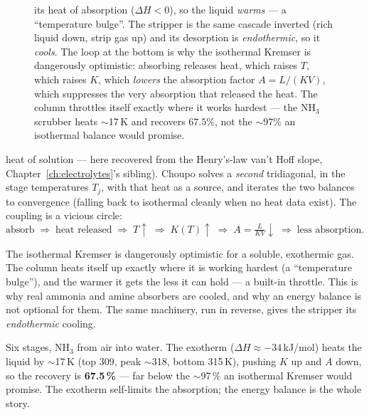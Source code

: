 \documentclass[11pt,a4paper]{article}
\begin{document}
\begin{figure}[ht]
{its heat of absorption ($\Delta H<0$), so the liquid \emph{warms} --- a
``temperature bulge''.  The stripper is the same cascade inverted (rich
liquid down, strip gas up) and its desorption is \emph{endothermic}, so
it \emph{cools}.  The loop at the bottom is why the isothermal Kremser is
dangerously optimistic: absorbing releases heat, which raises $T$, which
raises $K$, which \emph{lowers} the absorption factor $A=L/(KV)$, which
suppresses the very absorption that released the heat.  The column
throttles itself exactly where it works hardest --- the NH$_3$ scrubber
heats $\sim$17\,K and recovers $67.5\%$, not the $\sim$97\% an isothermal
balance would promise.}
\label{fig:absorber-stripper-mirror}
\end{figure}

heat of solution --- here recovered from the Henry's-law van't Hoff
slope, Chapter~\ref{ch:electrolytes}'s sibling).  Choupo solves a
\emph{second} tridiagonal, in the stage temperatures $T_j$, with that
heat as a source, and iterates the two balances to convergence (falling
back to isothermal cleanly when no heat data exist).  The coupling is a
vicious circle:
\begin{equation}
   \text{absorb} \;\Rightarrow\; \text{heat released}
   \;\Rightarrow\; T\!\uparrow
   \;\Rightarrow\; K(T)\!\uparrow
   \;\Rightarrow\; A=\tfrac{L}{KV}\!\downarrow
   \;\Rightarrow\; \text{less absorption}.
\end{equation}

\begin{intuition}
The isothermal Kremser is dangerously optimistic for a soluble,
exothermic gas.  The column heats itself up exactly where it is working
hardest (a ``temperature bulge''), and the warmer it gets the less it
can hold --- a built-in throttle.  This is why real ammonia and amine
absorbers are cooled, and why an energy balance is not optional for
them.  The same machinery, run in reverse, gives the stripper its
\emph{endothermic} cooling.
\end{intuition}

\begin{example}
Six stages, NH$_3$ from air into water.  The exotherm ($\Delta H
\approx -34$\,kJ/mol) heats the liquid by $\sim$17\,K (top 309, peak
$\sim$318, bottom 315\,K), pushing $K$ up and $A$ down, so the recovery
is \textbf{67.5\,\%} --- far below the $\sim$97\,\% an isothermal
Kremser would promise.  The exotherm self-limits the absorption; the
energy balance is the whole story.
\end{example}
\end{document}
